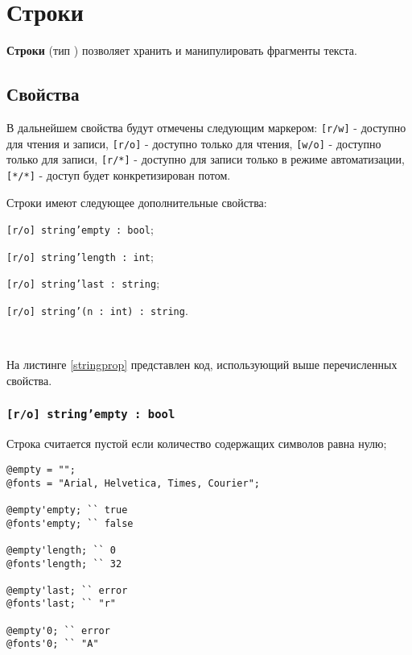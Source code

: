 \section{Строки}

{\bf Строки} (тип \str{}) позволяет хранить и манипулировать фрагменты текста. 

\subsection{Свойства}

В дальнейшем свойства будут отмечены следующим маркером: \texttt{[r/w]} - доступно для чтения и записи, \texttt{[r/o]} - доступно только для чтения, \texttt{[w/o]} - доступно только для записи,  \texttt{[r/*]} - доступно для записи только в режиме автоматизации, \texttt{[*/*]} - доступ будет конкретизирован потом.

Строки имеют следующее дополнительные свойства:
\begin{icItems}
\item
	\texttt{[r/o] string'empty : bool};
\item
	\texttt{[r/o] string'length : int};
\item
	\texttt{[r/o] string'last : string};
\item
    \texttt{[r/o] string'(n : int) : string}.
\end{icItems}

\

На листинге \ref{stringprop} представлен код, использующий выше перечисленных свойства.

\subsubsection{\texttt{[r/o] string'empty : bool}}

Строка считается пустой если количество содержащих символов равна нулю;

\begin{sourcecode}
\label{stringprop}
\begin{verbatim}
@empty = "";
@fonts = "Arial, Helvetica, Times, Courier";

@empty'empty; `` true
@fonts'empty; `` false

@empty'length; `` 0
@fonts'length; `` 32

@empty'last; `` error
@fonts'last; `` "r"

@empty'0; `` error
@fonts'0; `` "A"
\end{verbatim}
\end{sourcecode}

